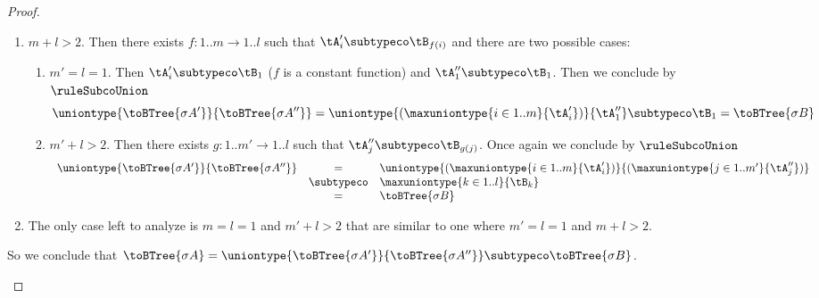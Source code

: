 \begin{proof}
\begin{itemize}
\begin{enumerate}
    \item $m + l > 2$. Then there exists $f : 1..m \to 1..l$ such that $\tA'_i
    \subtypeco \tB_{f(i)}$ and there are two possible cases:
    \begin{enumerate}
      \item $m' = l = 1$. Then $\tA'_i \subtypeco \tB_1$ (\ie $f$ is a constant
      function) and $\tA''_1 \subtypeco \tB_1$. Then we conclude by
      $\ruleSubcoUnion$ $$\uniontype{\toBTree{\sigma A'}}{\toBTree{\sigma A''}}
      = \uniontype{(\maxuniontype{i \in 1..m}{\tA'_i})}{\tA''_1} \subtypeco
      \tB_1 = \toBTree{\sigma B}$$
      
      \item $m' + l > 2$. Then there exists $g : 1..m' \to 1..l$ such that
      $\tA''_j \subtypeco \tB_{g(j)}$. Once again we conclude by
      $\ruleSubcoUnion$ $$
\begin{array}{rcl}
\uniontype{\toBTree{\sigma A'}}{\toBTree{\sigma A''}} & =          & \uniontype{(\maxuniontype{i \in 1..m}{\tA'_i})}{(\maxuniontype{j \in 1..m'}{\tA''_j})} \\
                                                      & \subtypeco & \maxuniontype{k \in 1..l}{\tB_k} \\
                                                      & =          & \toBTree{\sigma B}
\end{array} $$
    \end{enumerate}
    
    \item The only case left to analyze is $m = l = 1$ and $m' + l > 2$ that
    are similar to one where $m' = l = 1$ and $m + l > 2$.
  \end{enumerate}
  So we conclude that $\toBTree{\sigma A} =
  \uniontype{\toBTree{\sigma A'}}{\toBTree{\sigma A''}} \subtypeco
  \toBTree{\sigma B}$.
  

\end{itemize}
\end{proof}
